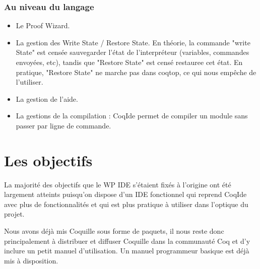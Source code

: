         \subsubsection{Au niveau du langage}
        
            \begin{itemize}
                \item Le Proof Wizard.
                \item La gestion des Write State / Restore State. En théorie, la commande "write State" est censée sauvegarder l'état de l'interpréteur (variables, commandes envoyées, etc), tandis que "Restore State" est censé restauree cet état.
						En pratique, "Restore State" ne marche pas dans coqtop, ce qui nous empêche de l'utiliser.
                \item La gestion de l'aide.
                \item La gestions de la compilation : CoqIde permet de compiler un module sans passer par ligne de commande.
            \end{itemize}

\section{Les objectifs}

La majorité des objectifs que le WP IDE s'étaient fixés à l'origine ont été largement atteints puisqu'on dispose d'un IDE fonctionnel qui reprend CoqIde avec plus de fonctionnalités et qui est plus pratique à utiliser dans l'optique du projet.

Nous avons déjà mis Coquille sous forme de paquets, il nous reste donc principalement à distribuer et diffuser Coquille dans la communauté Coq et d'y inclure un petit manuel d'utilisation. Un manuel programmeur basique est déjà mis à disposition.



